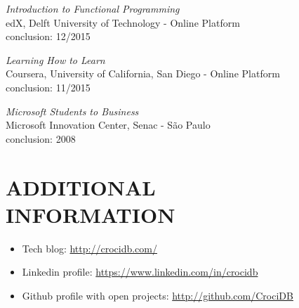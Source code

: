 \documentclass[line,margin]{res}
\begin{document}
\begin{resume}
		   {\sl Introduction to Functional Programming} \\
			edX, Delft University of Technology - Online Platform \\
			conclusion: 12/2015

		   {\sl Learning How to Learn} \\
			Coursera, University of California, San Diego - Online Platform\\
			conclusion: 11/2015
		
           {\sl Microsoft Students to Business} \\
                Microsoft Innovation Center, Senac - São Paulo \\
                conclusion: 2008 

\section{ADDITIONAL \\ INFORMATION}
            \begin{itemize}  \itemsep 1pt
	    	\item Tech blog: \href{http://crocidb.com/}{http://crocidb.com/}
            \item Linkedin profile: \href{https://www.linkedin.com/in/crocidb}{https://www.linkedin.com/in/crocidb}
            \item Github profile with open projects: \href{http://github.com/CrociDB}{http://github.com/CrociDB}
            \end{itemize} 

\end{resume}
\end{document}
